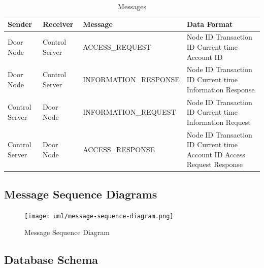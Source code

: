 \begin{table}[htb]
\begin{tabular}{ l | l | l | p{4.5cm} }
\toprule
Sender & Receiver & Message & Data Format\\
\midrule
Door Node & Control Server & ACCESS\_REQUEST &
Node ID \newline Transaction ID \newline Current time \newline Account ID\\
\hline
Door Node & Control Server & INFORMATION\_RESPONSE &
Node ID \newline Transaction ID \newline Current time \newline Information Response\\
\hline
Control Server & Door Node & INFORMATION\_REQUEST &
Node ID \newline Transaction ID \newline Current time \newline Information Request\\
\hline
Control Server & Door Node & ACCESS\_RESPONSE &
Node ID \newline Transaction ID \newline Current time \newline Account ID \newline Access Request Response\\
\bottomrule
\end{tabular}
\caption{Messages}
\end{table}

\subsection{Message Sequence Diagrams}

\begin{figure}[!htb]
\centering
\texttt{[image: uml/message-sequence-diagram.png]}
\caption{Message Sequence Diagram}
\label{fig:message-sequence-diagram}
\end{figure}

\subsection{Database Schema}


